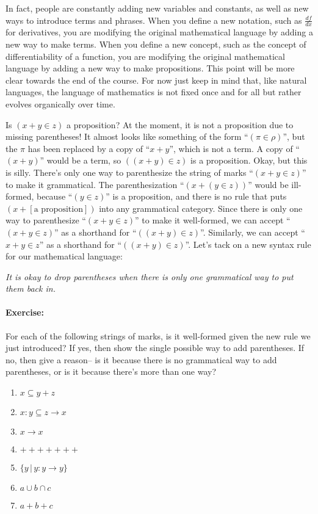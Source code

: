 \documentclass[12pt]{article}
\newcommand{\ex}[1]{\paragraph{Exercise:}#1}
\begin{document}
In fact, people are constantly adding new variables and constants, as well as new ways to introduce terms and phrases.
When you define a new notation, such as $\frac{df}{dx}$ for derivatives, you are modifying the original mathematical language by adding a new way to make terms.
When you define a new concept, such as the concept of differentiability of a function, you are  modifying the original mathematical language by adding a new way to make propositions.
This point will be more clear towards the end of the course.
For now just keep in mind that, like natural languages, the language of mathematics is not fixed once and for all but rather evolves organically over time.


Is $(x+y\in z)$ a proposition?
At the moment, it is not a proposition due to missing parentheses!
It almost looks like something of the form ``$(\pi\in\rho)$'',
but the $\pi$ has been replaced by a copy of ``$x+y$'', which is not a term. A copy of ``$(x+y)$''
would be a term, so $((x+y)\in z)$ is a proposition.
Okay, but this is silly. There's only one way to parenthesize the string of marks ``$(x+y\in z)$''
to make it grammatical. The parenthesization ``$(x+(y\in z))$'' would be ill-formed, because ``$(y\in z)$''
is a proposition, and there is no rule that puts $(x+[\text{a proposition}])$ into any grammatical category.
Since there is only one way to parenthesize ``$(x+y\in z)$'' to make it well-formed, we can accept
``$(x+y\in z)$'' as a shorthand for ``$((x+y)\in z)$''. Similarly, we can accept ``$x+y\in z$'' as a shorthand for
``$((x+y)\in z)$''. Let's tack on a new syntax rule for our mathematical language:
\begin{center}\textit{It is okay to drop parentheses when there is only one grammatical way to put them back in.}\end{center}

\ex{
For each of the following strings of marks,
is it well-formed given the new rule we just introduced?
If yes, then show the single possible way to add parentheses.
If no, then give a reason-- is it because there is no grammatical way to add parentheses, or is it because there's more than one way?
\begin{enumerate}
\item $x\subseteq y+z$
\item $x:y\subseteq z \rightarrow x$
\item $x\rightarrow x$
\item $+++++++$
\item $\{ y\,|\, y:y\rightarrow y \}$
\item $a\cup b\cap c$
\item $a + b + c$
\end{enumerate}
}
\end{document}
